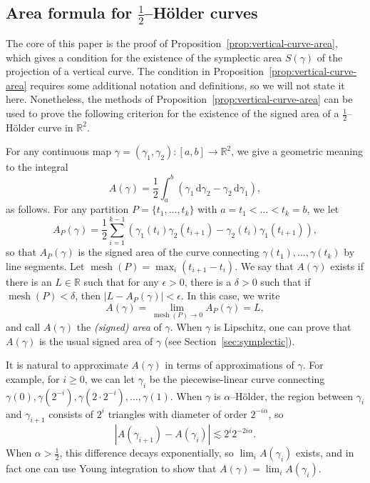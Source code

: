 \documentclass[12pt,reqno]{amsart}
\DeclareMathOperator{\mesh}{mesh}
\newcommand{\R}{\mathbb{R}}
\newcommand{\ud}[0]{\,\mathrm{d}}
\newcommand{\from}{\colon}
\theoremstyle{remark}
\newcommand{\0}{\mathbf{0}}
\renewcommand{\1}{\mathbf 1}
\begin{document}
\subsection{Area formula for \texorpdfstring{$\frac{1}{2}$--Hölder}{1/2--Hölder} curves}\label{sec:intro-area-rn}

The core of this paper is the proof of Proposition~\ref{prop:vertical-curve-area}, which gives a condition for the existence of the symplectic area $S(\gamma)$ of the projection of a vertical curve. The condition in Proposition~\ref{prop:vertical-curve-area} requires some additional notation and definitions, so we will not state it here. Nonetheless, the methods of Proposition~\ref{prop:vertical-curve-area} can be used to prove the following criterion for the existence of the signed area of a $\frac{1}{2}$--Hölder curve in $\R^2$.

For any continuous map $\gamma = (\gamma_1, \gamma_2) \from [a,b]\to \R^2$, we give a geometric meaning to the integral
\begin{equation}\label{eq:def-A-integral}
  A(\gamma) = \frac{1}{2} \int_a^b (\gamma_1 \ud \gamma_2 - \gamma_2 \ud \gamma_1),
\end{equation}
as follows. For any partition $P=\{t_1,\dots, t_k\}$ with $a=t_1 < \dots < t_k = b$, we let
\begin{equation}\label{eqn:signed-area}
  A_P(\gamma) = \frac{1}{2}\sum_{i=1}^{k-1} (\gamma_1(t_i) \gamma_2(t_{i+1}) - \gamma_2(t_i) \gamma_1(t_{i+1})),
\end{equation}
so that $A_P(\gamma)$ is the signed area of the curve connecting $\gamma(t_1), \dots, \gamma(t_k)$ by line segments. Let $\mesh(P) = \max_{i}(t_{i+1}-t_i)$. We say that $A(\gamma)$ exists if there is an $L\in \R$ such that for any $\epsilon>0$, there is a $\delta>0$ such that if $\mesh(P)<\delta$, then $|L-A_P(\gamma)|<\epsilon$. In this case, we write
\begin{equation}\label{eq:def-A}
  A(\gamma) = \lim_{\mesh(P)\to 0} A_P(\gamma) = L,
\end{equation}
and call $A(\gamma)$ the \emph{(signed) area} of $\gamma$. When $\gamma$ is Lipschitz, one can prove that $A(\gamma)$ is the usual signed area of $\gamma$ (see Section~\ref{sec:symplectic}). 
  
  It is natural to approximate $A(\gamma)$ in terms of approximations of $\gamma$. For example, for $i\ge 0$, we can let $\gamma_i$ be the piecewise-linear curve connecting $\gamma(0), \gamma(2^{-i}), \gamma(2\cdot 2^{-i}), \dots, \gamma(1)$. When $\gamma$ is $\alpha$--Hölder, the region between $\gamma_i$ and $\gamma_{i+1}$ consists of $2^i$ triangles with diameter of order $2^{-i\alpha}$, so 
  $$|A(\gamma_{i+1}) - A(\gamma_i)| \lesssim 2^i 2^{-2i\alpha}.$$
  When $\alpha > \frac{1}{2}$, this difference decays exponentially, so $\lim_i A(\gamma_i)$ exists, and in fact one can use Young integration to show that $A(\gamma) = \lim_i A(\gamma_i)$. 
  
\end{document}
